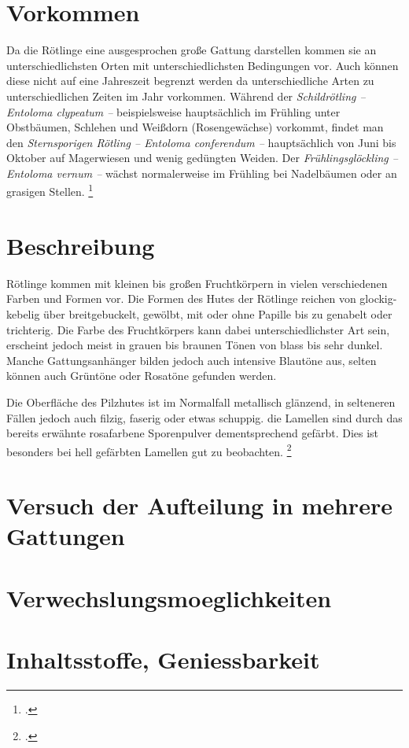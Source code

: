 \documentclass[a4paper,abstracton]{scrreprt}
\begin{document}
\section{Vorkommen}
Da die Rötlinge eine ausgesprochen große Gattung darstellen kommen sie an unterschiedlichsten Orten mit unterschiedlichsten Bedingungen vor. Auch können diese nicht auf eine Jahreszeit begrenzt werden da unterschiedliche Arten zu unterschiedlichen Zeiten im Jahr vorkommen. Während der \emph{Schildrötling -- Entoloma clypeatum --} beispielsweise hauptsächlich im Frühling unter Obstbäumen, Schlehen und Weißdorn (Rosengewächse) vorkommt, findet man den \emph{Sternsporigen Rötling -- Entoloma conferendum --} hauptsächlich von Juni bis Oktober auf Magerwiesen und wenig gedüngten Weiden. Der \emph{Frühlingsglöckling -- Entoloma vernum --} wächst normalerweise im Frühling bei Nadelbäumen oder an grasigen Stellen. 
\footcite{naturfuehrer} 
\section{Beschreibung}
Rötlinge kommen mit kleinen bis großen Fruchtkörpern in vielen verschiedenen Farben und Formen vor. Die Formen des Hutes der Rötlinge reichen von glockig-kebelig über breitgebuckelt, gewölbt, mit oder ohne Papille bis zu genabelt oder trichterig. Die Farbe des Fruchtkörpers kann dabei unterschiedlichster Art sein, erscheint jedoch meist in grauen bis braunen Tönen von blass bis sehr dunkel. Manche Gattungsanhänger bilden jedoch auch intensive Blautöne aus, selten können auch Grüntöne oder Rosatöne gefunden werden. 

Die Oberfläche des Pilzhutes ist im Normalfall metallisch glänzend, in selteneren Fällen jedoch auch filzig, faserig oder etwas schuppig. die Lamellen sind durch das bereits erwähnte rosafarbene Sporenpulver dementsprechend gefärbt. Dies ist besonders bei hell gefärbten Lamellen gut zu beobachten.
\footcite{beschreibung}

\section{Versuch der Aufteilung in mehrere Gattungen}
\section{Verwechslungsmoeglichkeiten}
\section{Inhaltsstoffe, Geniessbarkeit}
\end{document}
